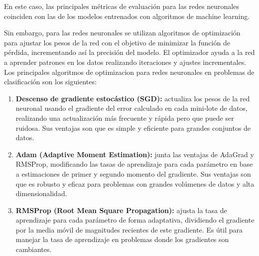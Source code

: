 En este caso, las principales métricas de evaluación para las redes neuronales coinciden con las de los modelos entrenados con algoritmos de machine learning.

Sin embargo, para las redes neuronales se utilizan algoritmos de optimización para ajustar los pesos de la red con el objetivo de minimizar la función de pérdida, incrementando así la precisión del modelo. El optimizador ayuda a la red a aprender patrones en los datos realizando iteraciones y ajustes incrementales. Los principales algoritmos de optimizacion para redes neuronales en problemas de clasificación son los siguientes:
\begin{enumerate}
    \item \textbf{Descenso de gradiente estocástico (SGD):} actualiza los pesos de la red neuronal usando el gradiente del error calculado en cada mini-lote de datos, realizando una actualización más frecuente y rápida pero que puede ser ruidosa. Sus ventajas son que es simple y eficiente para grandes conjuntos de datos.
    \item \textbf{Adam (Adaptive Moment Estimation):} junta las ventajas de AdaGrad y RMSProp, modificando las tasas de aprendizaje para cada parámetro en base a estimaciones de primer y segundo momento del gradiente. Sus ventajas son que es robusto y eficaz para problemas con grandes volúmenes de datos y alta dimensionalidad.
    \item \textbf{RMSProp (Root Mean Square Propagation):} ajusta la tasa de aprendizaje para cada parámetro de forma adaptativa, dividiendo el gradiente por la media móvil de magnitudes recientes de este gradiente. Es útil para manejar la tasa de aprendizaje en problemas donde los gradientes son cambiantes.
    
\end{enumerate}

